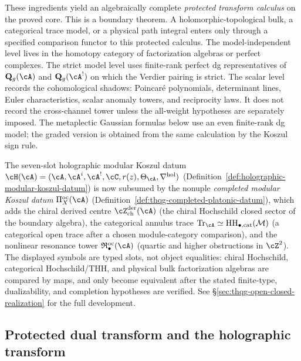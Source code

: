 These ingredients yield an algebraically complete
\emph{protected transform calculus} on the proved core. This is a
boundary theorem. A holomorphic-topological bulk, a categorical trace
model, or a physical path integral enters only through a specified
comparison functor to this protected calculus. The
model-independent level lives in the homotopy category of
factorization algebras or perfect complexes. The strict model level
uses finite-rank perfect dg representatives of
$\mathbf Q_g(\cA)$ and $\mathbf Q_g(\cA^!)$ on which the Verdier
pairing is strict. The scalar level records the cohomological
shadows: Poincar\'e polynomials, determinant lines, Euler
characteristics, scalar anomaly towers, and reciprocity laws. It does
not record the cross-channel tower unless the all-weight hypotheses
are separately imposed. The
metaplectic Gaussian formulas below use an even finite-rank dg model;
the graded version is obtained from the same calculation by the
Koszul sign rule.

The seven-slot holographic modular Koszul datum
$\cH(\cA) = (\cA, \cA^i, \cA^!, \cC, r(z), \Theta_\cA,
\nabla^{\mathrm{hol}})$
(Definition~\ref{def:holographic-modular-koszul-datum}) is now
subsumed by the nonuple \emph{completed modular Koszul datum}
$\Pi^{\mathrm{oc}}_X(\cA)$
(Definition~\ref{def:thqg-completed-platonic-datum}), which adds
the chiral derived centre
$\cZ^{\mathrm{der}}_{\mathrm{ch}}(\cA)$ (the chiral Hochschild
closed sector of the boundary algebra), the categorical annulus trace
$\mathrm{Tr}_\cA\simeq
\mathrm{HH}_{\bullet,\mathrm{cat}}(\mathcal M)$ (a categorical open
trace after a chosen module-category comparison), and the nonlinear
resonance tower
$\mathfrak{R}^{\mathrm{oc}}_\bullet(\cA)$ (quartic and higher
obstructions in $\cZ^2$).
The displayed symbols are typed slots, not object equalities:
chiral Hochschild, categorical Hochschild/THH, and physical bulk
factorization algebras are compared by maps, and only become
equivalent after the stated finite-type, dualizability, and completion
hypotheses are verified.
See \S\ref{sec:thqg-open-closed-realization} for the full
development.

\subsection{Protected dual transform and the holographic transform}
\label{subsec:frontier-protected-holographic-transform}

